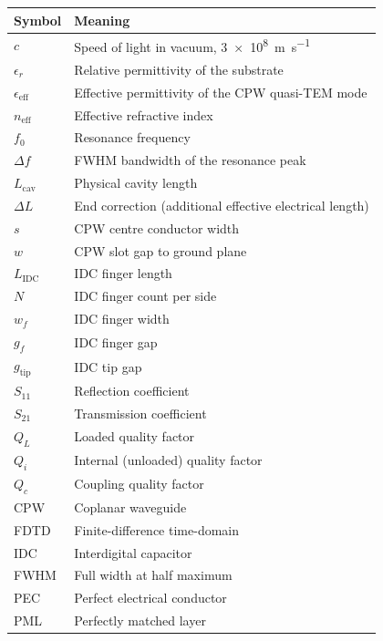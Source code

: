 \documentclass[12pt,a4paper]{article}
\begin{document}
\begin{tabular}{p{3.2cm} p{10.8cm}}
\toprule
\textbf{Symbol} & \textbf{Meaning} \\
\midrule
$c$                        & Speed of light in vacuum, \SI{3e8}{\metre\per\second} \\
$\epsilon_r$               & Relative permittivity of the substrate \\
$\epsilon_{\mathrm{eff}}$  & Effective permittivity of the CPW quasi-TEM mode \\
$n_{\mathrm{eff}}$         & Effective refractive index \\
$f_0$                      & Resonance frequency \\
$\Delta f$                 & FWHM bandwidth of the resonance peak \\
$L_{\mathrm{cav}}$         & Physical cavity length \\
$\Delta L$                 & End correction (additional effective electrical length) \\
$s$                        & CPW centre conductor width \\
$w$                        & CPW slot gap to ground plane \\
$L_{\mathrm{IDC}}$         & IDC finger length \\
$N$                        & IDC finger count per side \\
$w_f$                      & IDC finger width \\
$g_f$                      & IDC finger gap \\
$g_{\mathrm{tip}}$         & IDC tip gap \\
$S_{11}$                   & Reflection coefficient \\
$S_{21}$                   & Transmission coefficient \\
$Q_L$                      & Loaded quality factor \\
$Q_i$                      & Internal (unloaded) quality factor \\
$Q_c$                      & Coupling quality factor \\
CPW                        & Coplanar waveguide \\
FDTD                       & Finite-difference time-domain \\
IDC                        & Interdigital capacitor \\
FWHM                       & Full width at half maximum \\
PEC                        & Perfect electrical conductor \\
PML                        & Perfectly matched layer \\
\bottomrule
\end{tabular}
\end{document}
